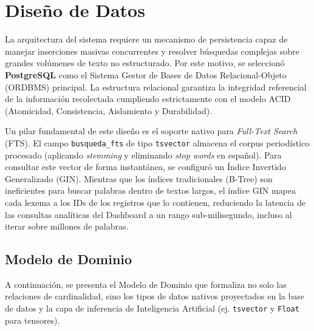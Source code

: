 
\section{Diseño de Datos}
\label{sec:diseno_datos}

La arquitectura del sistema requiere un mecanismo de persistencia capaz de manejar inserciones masivas concurrentes y resolver búsquedas complejas sobre grandes volúmenes de texto no estructurado. Por este motivo, se seleccionó \textbf{PostgreSQL} como el Sistema Gestor de Bases de Datos Relacional-Objeto (ORDBMS) principal. La estructura relacional garantiza la integridad referencial de la información recolectada cumpliendo estrictamente con el modelo ACID (Atomicidad, Consistencia, Aislamiento y Durabilidad). 

Un pilar fundamental de este diseño es el soporte nativo para \textit{Full-Text Search} (FTS). El campo \texttt{busqueda\_fts} de tipo \texttt{tsvector} almacena el corpus periodístico procesado (aplicando \textit{stemming} y eliminando \textit{stop words} en español). Para consultar este vector de forma instantánea, se configuró un Índice Invertido Generalizado (GIN). Mientras que los índices tradicionales (B-Tree) son ineficientes para buscar palabras dentro de textos largos, el índice GIN mapea cada lexema a los IDs de los registros que lo contienen, reduciendo la latencia de las consultas analíticas del Dashboard a un rango sub-milisegundo, incluso al iterar sobre millones de palabras.

\subsection{Modelo de Dominio}

A continuación, se presenta el Modelo de Dominio que formaliza no solo las relaciones de cardinalidad, sino los tipos de datos nativos proyectados en la base de datos y la capa de inferencia de Inteligencia Artificial (ej. \texttt{tsvector} y \texttt{Float} para tensores).

